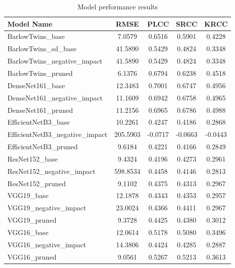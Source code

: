 \begin{table}[h!]
\centering
\begin{tabular}{lcccc}
\hline
Model Name & RMSE & PLCC & SRCC & KRCC \\
\hline
BarlowTwins_base & 7.0579 & 0.6516 & 0.5901 & 0.4228 \\
BarlowTwins_sd_base & 41.5890 & 0.5429 & 0.4824 & 0.3348 \\
BarlowTwins_negative_impact & 41.5890 & 0.5429 & 0.4824 & 0.3348 \\
BarlowTwins_pruned & 6.1376 & 0.6794 & 0.6238 & 0.4518 \\
DenseNet161_base & 12.3483 & 0.7001 & 0.6747 & 0.4956 \\
DenseNet161_negative_impact & 11.1609 & 0.6942 & 0.6758 & 0.4965 \\
DenseNet161_pruned & 11.2156 & 0.6965 & 0.6786 & 0.4988 \\
EfficientNetB3_base & 10.2261 & 0.4247 & 0.4186 & 0.2868 \\
EfficientNetB3_negative_impact & 205.5903 & -0.0717 & -0.0663 & -0.0443 \\
EfficientNetB3_pruned & 9.6184 & 0.4221 & 0.4166 & 0.2849 \\
ResNet152_base & 9.4324 & 0.4196 & 0.4273 & 0.2961 \\
ResNet152_negative_impact & 598.8534 & 0.4458 & 0.4146 & 0.2813 \\
ResNet152_pruned & 9.1102 & 0.4375 & 0.4313 & 0.2967 \\
VGG19_base & 12.1878 & 0.4343 & 0.4353 & 0.2957 \\
VGG19_negative_impact & 23.0024 & 0.4366 & 0.4411 & 0.2967 \\
VGG19_pruned & 9.3728 & 0.4425 & 0.4380 & 0.3012 \\
VGG16_base & 12.0614 & 0.5178 & 0.5080 & 0.3496 \\
VGG16_negative_impact & 14.3806 & 0.4424 & 0.4285 & 0.2887 \\
VGG16_pruned & 9.0561 & 0.5267 & 0.5213 & 0.3613 \\
\hline
\end{tabular}
\caption{Model performance results}
\label{tab:model_results}
\end{table}
